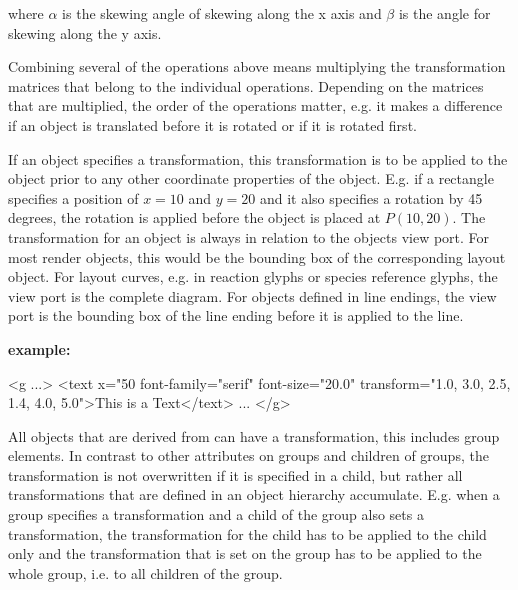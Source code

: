 where $\alpha$ is the skewing angle of skewing along the x axis and $\beta$ is the angle for skewing along the y axis.

Combining several of the operations above means multiplying the transformation matrices that belong to the individual operations.
Depending on the matrices that are multiplied, the order of the operations matter, e.g. it makes a difference if an object is translated before it is rotated or if it is rotated first.

If an object specifies a transformation, this transformation is to be applied to the object prior to any other coordinate properties of the object. E.g. if a rectangle specifies a position of $x=10$ and $y=20$ and it also specifies a rotation by 45 degrees, the rotation is applied before the object is placed at $P(10,20)$.
The transformation for an object is always in relation to the objects view port. For most render objects, this would be the bounding box of the corresponding layout object. For layout curves, e.g. in reaction glyphs or species reference glyphs, the view port is the complete diagram.
For objects defined in line endings, the view port is the bounding box of the line ending before it is applied to the line.

\vspace*{0.25cm}
{\large
{\bf
example:
}
}

{\footnotesize
\begin{example}
 <g ...>
   <text x="50%
        font-family="serif" font-size="20.0" 
        transform="1.0, 3.0, 2.5, 1.4, 4.0, 5.0">This is a Text</text>
      ...
</g> 
\end{example}
}

All objects that are derived from \TransformationTwoD can have a transformation, this includes group elements. In contrast to other attributes on groups and children of groups, the transformation is not overwritten if it is specified in a child, but rather all transformations that are defined in an object hierarchy accumulate. E.g. when a group specifies a transformation and a child of the group also sets a transformation, the transformation for the child has to be applied to the child only and the transformation that is set on the group has to be applied to the whole group, i.e. to all children of the group.


